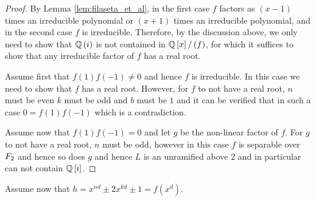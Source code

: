 \documentclass[../main.tex]{subfiles}
\begin{document}
\begin{proof} 
  By Lemma \ref{lem:filaseta_et_al}, in the first case $f$ factors as $\left( x - 1 \right)$ times an irreducible polynomial or $\left( x + 1 \right)$ times an irreducible polynomial, and in the second case $f$ is irreducible. 
  Therefore, by the discussion above, we only need to show that $\mathbb{Q}\left( i \right)$ is not contained in $\mathbb{Q}\left[ x \right] / \left( f \right)$, for which it suffices to show that any irreducible factor of $f$ has a real root.

  Assume first that $f\left( 1 \right)f\left( -1 \right) \neq 0$ and hence $f$ is irreducible.
  In this case we need to show that $f$ has a real root.
  However, for $f$ to not have a real root, $n$ must be even $k$ must be odd and $b$ must be $1$ and it can be verified that in such a case $0 = f\left( 1 \right)f\left( -1 \right)$ which is a contradiction.
  
  Assume now that $f\left( 1 \right)f\left( -1 \right) = 0$ and let $g$ be the non-linear factor of $f$.
  For $g$ to not have a real root, $n$ must be odd, however in this case $f$ is separable over $F_2$ and hence so does $g$ and hence $L$ is an unramified above $2$ and in particular can not contain $\mathbb{Q}\left[ i \right]$.
\end{proof}

Assume now that $h = x^{nd} \pm 2x^{kd} \pm 1 = f\left( x^d \right)$.
\begin{lemma}
  
\end{lemma}
\end{document}
